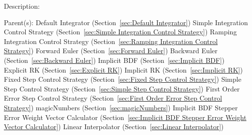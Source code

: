 \begin{list}{}
  {\setlength{\leftmargin}{1.0in}
   \setlength{\labelwidth}{0.75in}
   \setlength{\labelsep}{0.125in}}
  \item[Description:]
  \item[Parent(s):]
    Default Integrator (Section~\ref{sec:Default Integrator})
      \newline 
    Simple Integration Control Strategy (Section~\ref{sec:Simple Integration Control Strategy})
      \newline 
    Ramping Integration Control Strategy (Section~\ref{sec:Ramping Integration Control Strategy})
      \newline 
    Forward Euler (Section~\ref{sec:Forward Euler})
      \newline 
    Backward Euler (Section~\ref{sec:Backward Euler})
      \newline 
    Implicit BDF (Section~\ref{sec:Implicit BDF})
      \newline 
    Explicit RK (Section~\ref{sec:Explicit RK})
      \newline 
    Implicit RK (Section~\ref{sec:Implicit RK})
      \newline 
    Fixed Step Control Strategy (Section~\ref{sec:Fixed Step Control Strategy})
      \newline 
    Simple Step Control Strategy (Section~\ref{sec:Simple Step Control Strategy})
      \newline 
    First Order Error Step Control Strategy (Section~\ref{sec:First Order Error Step Control Strategy})
      \newline 
    magicNumbers (Section~\ref{sec:magicNumbers})
      \newline 
    Implicit BDF Stepper Error Weight Vector Calculator (Section~\ref{sec:Implicit BDF Stepper Error Weight Vector Calculator})
      \newline 
    Linear Interpolator (Section~\ref{sec:Linear Interpolator})
      \newline 

\end{list}
